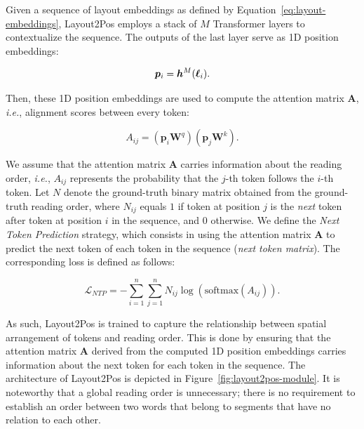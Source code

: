 Given a sequence of layout embeddings as defined by Equation~\ref{eq:layout-embeddings}, Layout2Pos employs a stack of $M$ Transformer layers to contextualize the sequence. The outputs of the last layer serve as 1D position embeddings:

\begin{equation}
  \bm{p}_i = \bm{h}^M(\boldsymbol{\ell}_i).
\end{equation}

\noindent Then, these 1D position embeddings are used to compute the attention matrix $\bm{A}$, \textit{i.e.}, alignment scores between every token:

\begin{equation}
  A_{ij} = \left(\bm{p}_i \bm{W}^q\right)\left(\bm{p}_j \bm{W}^k\right).
\end{equation}

\noindent We assume that the attention matrix $\bm{A}$ carries information about the reading order, \textit{i.e.}, $A_{ij}$ represents the probability that the $j$-th token follows the $i$-th token. Let $N$ denote the ground-truth binary matrix obtained from the ground-truth reading order, where $N_{ij}$ equals $1$ if token at position $j$ is the \textit{next} token after token at position $i$ in the sequence, and $0$ otherwise. We define the \textit{Next Token Prediction} strategy, which consists in using the attention matrix $\bm{A}$ to predict the next token of each token in the sequence (\textit{next token matrix}). The corresponding loss is defined as follows:

\begin{equation}
  \mathcal{L}_{NTP} = - \sum_{i=1}^n \sum_{j=1}^n N_{ij} \log\left(\textrm{softmax}(A_{ij})\right).
\end{equation}

\noindent As such, Layout2Pos is trained to capture the relationship between spatial arrangement of tokens and reading order. This is done by ensuring that the attention matrix $\bm{A}$ derived from the computed 1D position embeddings carries information about the next token for each token in the sequence. The architecture of Layout2Pos is depicted in Figure~\ref{fig:layout2pos-module}. It is noteworthy that a global reading order is unnecessary; there is no requirement to establish an order between two words that belong to segments that have no relation to each other.


